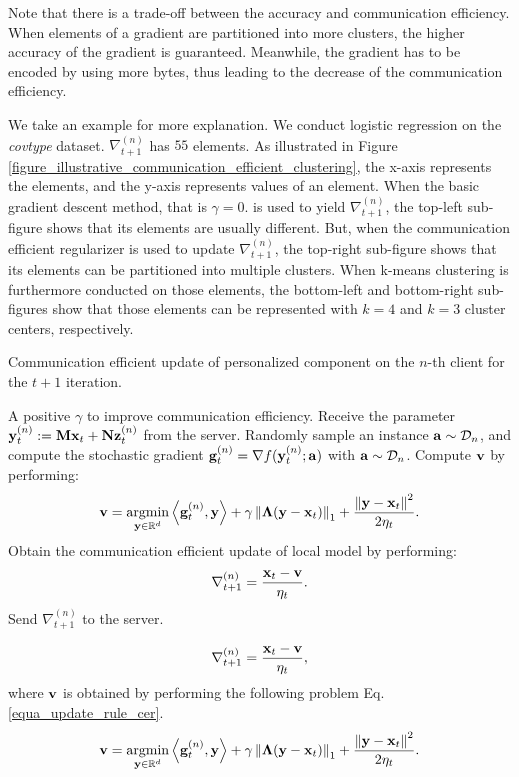 \documentclass[journal]{IEEEtran}
\begin{document}
Note that there is a trade-off between the accuracy and communication efficiency. When elements of a gradient are partitioned into more clusters, the higher accuracy of the gradient is guaranteed. Meanwhile, the gradient has to be encoded by using more bytes, thus leading to the decrease of the communication efficiency.  

We take an example for more explanation. We conduct logistic regression on the \textit{covtype} dataset. $\nabla_{t+1}^{(n)}$ has $55$ elements. As illustrated in Figure \ref{figure_illustrative_communication_efficient_clustering}, the x-axis represents the elements, and the y-axis represents values of an element. When the basic gradient descent method, that is $\gamma = 0$. is used to yield $\nabla_{t+1}^{(n)}$, the top-left sub-figure shows that its elements are usually different. But, when the communication efficient regularizer is used to update $\nabla_{t+1}^{(n)}$, the top-right sub-figure shows that its elements can be partitioned into multiple clusters.  When k-means clustering is furthermore conducted on those elements, the bottom-left and bottom-right sub-figures show that those elements can be represented with $k=4$ and $k=3$ cluster centers, respectively.  

\begin{algorithm}[!t]
    \caption{Communication efficient update of personalized component on the $n$-th client for the $t+1$ iteration.}
    \label{algo_xxx}
    \begin{algorithmic}[1]
        \Require A positive $\gamma$ to improve communication efficiency.
        \State Receive the parameter ${\bf y}_t^{(n)} := {\bf M}{\bf x}_t + {\bf N}{\bf z}_t^{(n)}$ from the server.
        \State Randomly sample an instance ${\bf a}\sim\mathcal{D}_n$, and compute the stochastic gradient ${\bf g}^{(n)}_t = \nabla f({\bf y}_t^{(n)};{\bf a})$ with ${\bf a}\sim\mathcal{D}_n$.
        \State Compute ${\bf v}$ by performing:
        \begin{align}
        \nonumber
        \v = \argmin_{\y\in\RR^d} \lrangle {\g^{(n)}_t, \y} + \gamma \lrnorm{\bLambda(\y - \x_t)}_1 + \frac{\lrnorm{\y - \x_t}^2}{2\eta_t}. 
       \end{align} 
       \State Obtain the communication efficient update of local model by performing:
       $$\nabla_{t+1}^{(n)} = \frac{{\bf x}_t - {\bf v}}{\eta_t}.$$
       \State Send $\nabla_{t+1}^{(n)}$ to the server.
    \end{algorithmic}
\end{algorithm} 

\begin{align}
\nonumber
\nabla_{t+1}^{(n)} = \frac{{\bf x}_t - {\bf v}}{\eta_t}, 
\end{align} where ${\bf v}$ is obtained by performing the following problem Eq. \ref{equa_update_rule_cer}.
\begin{align}
\nonumber
\v = \argmin_{\y\in\RR^d} \lrangle {\g^{(n)}_t, \y} + \gamma \lrnorm{\bLambda(\y - \x_t)}_1 + \frac{\lrnorm{\y - \x_t}^2}{2\eta_t}. 
\end{align} 
\end{document}
